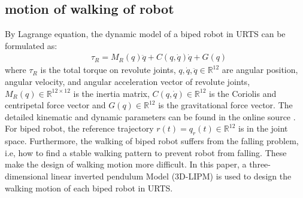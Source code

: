 \documentclass{ieeeaccess}
\begin{document}


\subsection{motion of walking of robot}
By Lagrange equation, the dynamic model of a biped robot in URTS can be formulated as:
\begin{equation} \label{eq:robot} 
    \begin{split}
        & \tau_R = M_R(q)\ddot{q} + C(q,\dot{q})\dot{q} + G(q)    
    \end{split}
\end{equation}
where $\tau_R$ is the total torque on revolute joints, $q,\dot{q},\ddot{q}\in\mathbb{R}^{12}$  are angular position, angular velocity, and angular acceleration vector of revolute joints, $M_R(q)\in\mathbb{R}^{12\times 12}$ is the inertia matrix, $C(q,\dot{q})\in\mathbb{R}^{12}$ is the Coriolis and centripetal force vector and $G(q)\in\mathbb{R}^{12}$ is the gravitational force vector. The detailed kinematic and dynamic parameters can be found in the online source \cite{ourrobot}. For biped robot, the reference trajectory $r(t)=q_r(t)\in\mathbb{R}^{12}$ is in the joint space. Furthermore, the walking of biped robot suffers from the falling problem, i.e, how to find a stable walking pattern to prevent robot from falling. These make the design of walking motion more difficult. In this paper, a three-dimensional linear inverted pendulum Model (3D-LIPM) \cite{kajita2001real} is used to design the walking motion of each biped robot in URTS.
\end{document}
